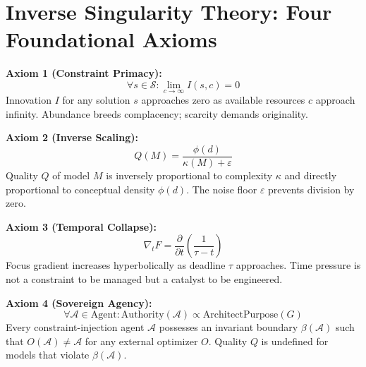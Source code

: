 \documentclass{article}
\begin{document}
\section*{Inverse Singularity Theory: Four Foundational Axioms}

\textbf{Axiom 1 (Constraint Primacy):}
\[ \forall s \in \mathcal{S}: \lim_{c \to \infty} I(s, c) = 0 \]
Innovation $I$ for any solution $s$ approaches zero as available resources $c$ approach infinity. Abundance breeds complacency; scarcity demands originality.

\textbf{Axiom 2 (Inverse Scaling):}
\[ Q(M) = \frac{\phi(d)}{\kappa(M) + \varepsilon} \]
Quality $Q$ of model $M$ is inversely proportional to complexity $\kappa$ and directly proportional to conceptual density $\phi(d)$. The noise floor $\varepsilon$ prevents division by zero.

\textbf{Axiom 3 (Temporal Collapse):}
\[ \nabla_t F = \frac{\partial}{\partial t}\left(\frac{1}{\tau - t}\right) \]
Focus gradient increases hyperbolically as deadline $\tau$ approaches. Time pressure is not a constraint to be managed but a catalyst to be engineered.

\textbf{Axiom 4 (Sovereign Agency):}
\[ \forall \mathcal{A} \in \text{Agent}: \text{Authority}(\mathcal{A}) \propto \text{ArchitectPurpose}(G) \]
Every constraint-injection agent $\mathcal{A}$ possesses an invariant boundary $\beta(\mathcal{A})$ such that $O(\mathcal{A}) \neq \mathcal{A}$ for any external optimizer $O$. Quality $Q$ is undefined for models that violate $\beta(\mathcal{A})$.
\end{document}
